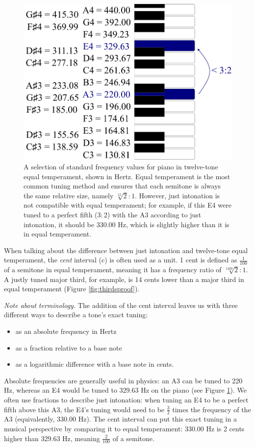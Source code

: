 \documentclass[a4paper]{article}
\begin{document}
\begin{figure}
	\centering
	\includegraphics[height=0.35\textheight]{Figures/12TET.pdf} %
	\caption{A selection of standard frequency values for piano in twelve-tone equal temperament, shown in Hertz. Equal temperament is the most common tuning method and ensures that each semitone is always the same relative size, namely $\sqrt[12]{2}:1$. However, just intonation is not compatible with equal temperament; for example, if this E4 were tuned to a perfect fifth ($3:2$) with the A3 according to just intonation, it should be $330.00$ Hz, which is slightly higher than it is in equal temperament.}
	\label{fig:12TET}
\end{figure}

When talking about the difference between just intonation and twelve-tone equal temperament, the \textit{cent} interval (c) is often used as a unit. 1 cent is defined as $\frac{1}{100}$ of a semitone in equal temperament, meaning it has a frequency ratio of $\sqrt[1200]{2}:1$. A justly tuned major third, for example, is 14 cents lower than a major third in equal temperament (Figure \ref{fig:thirdsproof}).

\textit{Note about terminology.} The addition of the cent interval leaves us with three different ways to describe a tone's exact tuning:
\begin{itemize}
	\item as an absolute frequency in Hertz
	\item as a fraction relative to a base note
	\item as a logarithmic difference with a base note in cents.
\end{itemize}
Absolute frequencies are generally useful in physics: an A3 can be tuned to 220 Hz, whereas an E4 would be tuned to 329.63 Hz on the piano (see Figure \ref{fig:12TET}). We often use fractions to describe just intonation: when tuning an E4 to be a perfect fifth above this A3, the E4's tuning would need to be $\frac32$ times the frequency of the A3 (equivalently, 330.00 Hz). The cent interval can put this exact tuning in a musical perspective by comparing it to equal temperament: 330.00 Hz is 2 cents higher than 329.63 Hz, meaning $\frac{2}{100}$ of a semitone.
\end{document}
